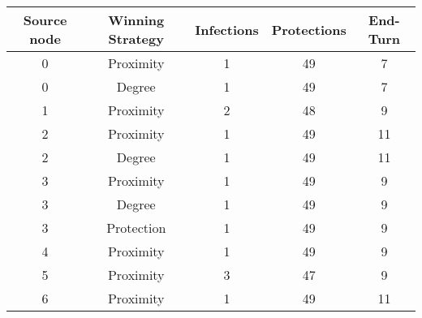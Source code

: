\documentclass[results.tex]{subfiles}
\begin{document}
    \begin{center}
        \begin{tabular}{| c || c | c | c | c |}
            \hline
            {\bfseries Source node} & {\bfseries Winning Strategy} & {\bfseries Infections} & {\bfseries Protections}
            & {\bfseries End-Turn}
            \\  %
            \hline\hline
            0                       & Proximity                    & 1                      & 49                      & 7                    \\
            \hline
            0                       & Degree                       & 1                      & 49                      & 7                    \\
            \hline
            1                       & Proximity                    & 2                      & 48                      & 9                    \\
            \hline
            2                       & Proximity                    & 1                      & 49                      & 11                   \\
            \hline
            2                       & Degree                       & 1                      & 49                      & 11                   \\
            \hline
            3                       & Proximity                    & 1                      & 49                      & 9                    \\
            \hline
            3                       & Degree                       & 1                      & 49                      & 9                    \\
            \hline
            3                       & Protection                   & 1                      & 49                      & 9                    \\
            \hline
            4                       & Proximity                    & 1                      & 49                      & 9                    \\
            \hline
            5                       & Proximity                    & 3                      & 47                      & 9                    \\
            \hline
            6                       & Proximity                    & 1                      & 49                      & 11                   \\

\end{tabular}
\end{center}
\end{document}
